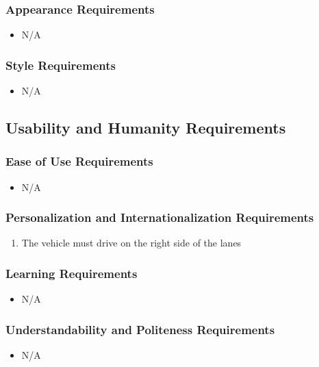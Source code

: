\documentclass [11pt]{article}
\begin{document}
\subsubsection{Appearance Requirements}
	\begin{itemize}
		\item  N/A
	\end{itemize}


\subsubsection{Style Requirements}
	\begin{itemize}
		\item N/A
	\end{itemize}

\subsection{Usability and Humanity Requirements} 
\subsubsection{Ease of Use Requirements}
	\begin{itemize}
		\item N/A
	\end{itemize}

\subsubsection{Personalization and Internationalization Requirements}
	\begin{enumerate}[label=\textbf{\Alph*}:]
		\item The vehicle must drive on the right side of the lanes
	\end{enumerate}

\subsubsection{Learning Requirements }
	\begin{itemize}
		\item N/A
	\end{itemize}

\subsubsection{Understandability and Politeness Requirements}
	\begin{itemize}
		\item N/A
	\end{itemize}
		
\end{document}
